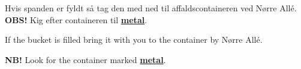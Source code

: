 \documentclass{article}
\begin{document}
\maketitle

\null
\vspace{-1.5cm}


\vspace{-0.4in}

\begin{center}

\huge Hvis spanden er fyldt så tag den med ned til affaldscontaineren ved Nørre
Allé. \\
\textbf{OBS!} Kig efter containeren til \underline{\textbf{metal}}.

\end{center}

\english


\vspace{-0.4in}

\begin{center}

\huge If the bucket is filled bring it with you to the container by Nørre Allé.

\textbf{NB!} Look for the container marked \underline{\textbf{metal}}.

\end{center}

\dansk

\underskriv
\end{document}

